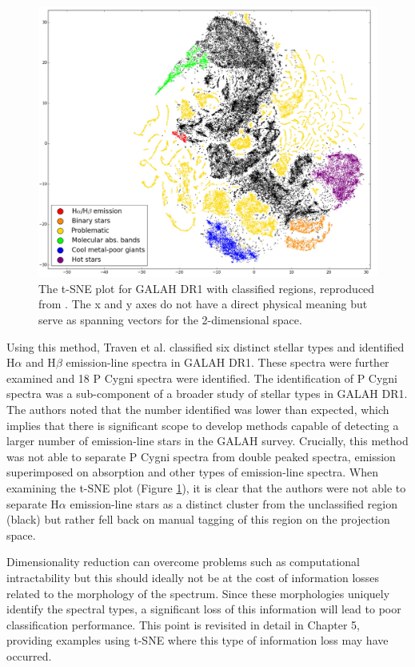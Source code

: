 \begin{figure}[!htb]
\centering
\includegraphics[scale=0.36]{figures/tsne traven.png}
\caption{The t-SNE plot for GALAH DR1 with classified regions, reproduced from \citet{traven2017galah}. The x and y axes do not have a direct physical meaning but serve as spanning vectors for the 2-dimensional space.}
\label{fig2.6}
\end{figure}

Using this method, Traven et al. classified six distinct stellar types and identified H$\alpha$ and H$\beta$ emission-line spectra in GALAH DR1. These spectra were further examined and 18 P Cygni spectra were identified. The identification of P Cygni spectra was a sub-component of a broader study of stellar types in GALAH DR1. The authors noted that the number identified was lower than expected, which implies that there is significant scope to develop methods capable of detecting a larger number of emission-line stars in the GALAH survey. Crucially, this method was not able to separate P Cygni spectra from double peaked spectra, emission superimposed on absorption and other types of emission-line spectra. When examining the t-SNE plot (Figure \ref{fig2.6}), it is clear that the authors were not able to separate H$\alpha$ emission-line stars as a distinct cluster from the unclassified region (black) but rather fell back on manual tagging of this region on the projection space. 

Dimensionality reduction can overcome problems such as computational intractability but this should ideally not be at the cost of information losses related to the morphology of the spectrum. Since these morphologies uniquely identify the spectral types, a significant loss of this information will lead to poor classification performance. This point is revisited in detail in Chapter 5, providing examples using t-SNE where this type of information loss may have occurred.

